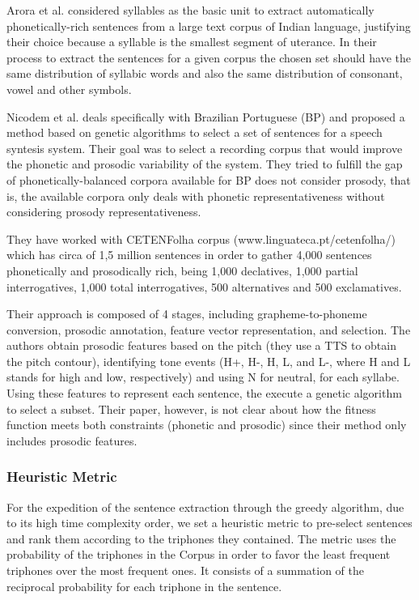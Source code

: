 Arora et al.\cite{Arora2004} considered syllables as the basic unit to extract automatically 
phonetically-rich sentences from a large text corpus of Indian language, 
justifying their choice because a syllable is the smallest segment of uterance. 
In their process to extract the sentences for a given corpus the chosen set 
should have the same distribution of syllabic words and also the same distribution 
of consonant, vowel and other symbols.

Nicodem et al.\cite{Nicodem2007} deals specifically with Brazilian Portuguese (BP) 
and proposed a method based on genetic algorithms to select a set of sentences 
for a speech syntesis system. Their goal was to select a recording corpus that would 
improve the phonetic and prosodic variability of the system. They tried to fulfill the 
gap of phonetically-balanced corpora available for BP does not consider prosody, that is, 
the available corpora only deals with phonetic representativeness without considering 
prosody representativeness.

They have worked with CETENFolha corpus (www.linguateca.pt/cetenfolha/) which has circa of 
1,5 million sentences in order to gather 4,000 sentences phonetically and prosodically 
rich, being 1,000 declatives, 1,000 partial interrogatives, 1,000 total interrogatives, 
500 alternatives and 500 exclamatives.   

Their approach is composed of 4 stages, including grapheme-to-phoneme conversion, 
prosodic annotation, feature vector representation, and selection. 
The authors obtain prosodic features based on the pitch (they use a TTS to obtain the pitch contour), identifying tone events (H+, H-, H, L, and L-, where H and L stands for high and low, respectively) and using N for neutral, 
for each syllabe. Using these features to represent each sentence, the execute a genetic algorithm to select a subset. Their paper, however, is not 
clear about how the fitness function meets both constraints (phonetic and prosodic) since 
their method only includes prosodic features.

\subsubsection{Heuristic Metric}

For the expedition of the sentence extraction through the greedy algorithm, due to its high time complexity order,
we set a heuristic metric to pre-select sentences and rank them according to the triphones they contained. The metric 
uses the probability of the triphones in  the Corpus in order to favor the least frequent triphones over the most frequent ones. 
It consists of a summation of the reciprocal probability for each triphone in the sentence.


